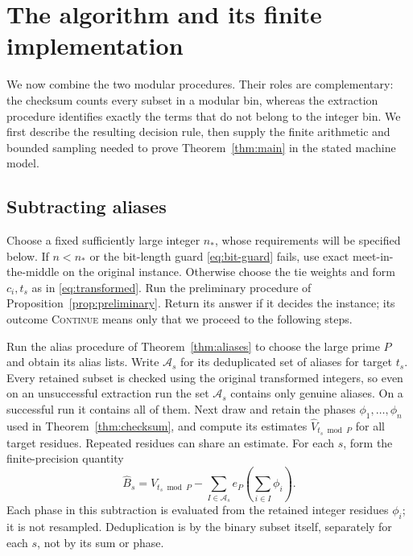 \section{The algorithm and its finite implementation}
\label{sec:implementation}

We now combine the two modular procedures.  Their roles are complementary:
the checksum counts every subset in a modular bin, whereas the extraction
procedure identifies exactly the terms that do not belong to the integer
bin.  We first describe the resulting decision rule, then supply the finite
arithmetic and bounded sampling needed to prove Theorem~\ref{thm:main} in
the stated machine model.

\subsection{Subtracting aliases}

Choose a fixed sufficiently large integer $n_*$, whose requirements will be
specified below.  If $n<n_*$ or the bit-length guard
\eqref{eq:bit-guard} fails, use exact meet-in-the-middle on the original
instance.  Otherwise choose the tie weights and form $c_i,t_s$ as in
\eqref{eq:transformed}.  Run the preliminary procedure of
Proposition~\ref{prop:preliminary}.  Return its answer if it decides the
instance; its outcome \textsc{Continue} means only that we proceed to the
following steps.

Run the alias procedure of Theorem~\ref{thm:aliases} to choose the large
prime $P$ and obtain its alias lists.  Write $\mathcal A_s$ for its
deduplicated set of aliases for target $t_s$.  Every retained subset is checked using the
original transformed integers, so even on an unsuccessful extraction run
the set $\mathcal A_s$ contains only genuine aliases.  On a successful run
it contains all of them.  Next draw and retain the phases
$\phi_1,\ldots,\phi_n$ used in Theorem~\ref{thm:checksum}, and compute its
estimates $\widehat V_{t_s\bmod P}$ for all target residues.  Repeated
residues can share an estimate.  For each $s$, form the finite-precision
quantity
\begin{equation}
 \widehat B_s
 =\widehat V_{t_s\bmod P}
  -\sum_{I\in\mathcal A_s}
       e_P\left(\sum_{i\in I}\phi_i\right).
 \label{eq:subtract-aliases}
\end{equation}
Each phase in this subtraction is evaluated from the retained integer
residues $\phi_i$; it is not resampled.  Deduplication is by the binary
subset itself, separately for each $s$, not by its sum or phase.

